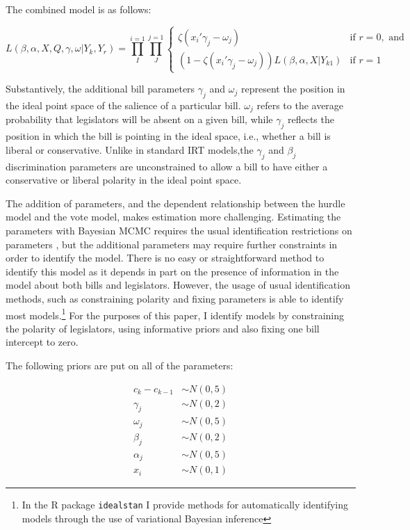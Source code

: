 	The combined model is as follows:
	
		 \[
	L(\beta,\alpha,X,Q,\gamma,\omega|Y_{k},Y_{r}) = 
	\prod_{I}^{i=1} \prod_{J}^{j=1}
	\begin{cases}
	\zeta(x_{i}'\gamma_j - \omega_j ) & \text{if } r=0, \text{ and} \\
	(1-\zeta({x_{i}'\gamma_j - \omega_j}))L(\beta,\alpha,X|Y_{k1}) & \text{if } r=1
	\end{cases}
	\]
	
	Substantively, the additional bill parameters $\gamma_j$ and $\omega_j$ represent the position in the ideal point space of the salience of a particular bill. $\omega_j$ refers to the average probability that legislators will be absent on a given bill, while $\gamma_j$ reflects the position in which the bill is pointing in the ideal space, i.e., whether a bill is liberal or conservative. Unlike in standard IRT models,the $\gamma_j$ and $\beta_j$ discrimination parameters are unconstrained to allow a bill to have either a conservative or liberal polarity in the ideal point space. 
	
	The addition of parameters, and the dependent relationship between the hurdle model and the vote model, makes estimation more challenging. Estimating the parameters with Bayesian MCMC requires the usual identification restrictions on parameters \parencite{jackman2004,gelman2005}, but the additional parameters may require further constraints in order to identify the model. There is no easy or straightforward method to identify this model as it depends in part on the presence of information in the model about both bills and legislators. However, the usage of usual identification methods, such as constraining polarity and fixing parameters is able to identify most models.\footnote{In the R package \texttt{idealstan} I provide methods for automatically identifying models through the use of variational Bayesian inference} For the purposes of this paper, I identify models by constraining the polarity of legislators, using informative priors and also fixing one bill intercept to zero.
	
	The following priors are put on all of the parameters:
	
	\begin{align*}
		c_k - c_{k-1} &\sim N(0,5)\\
		\gamma_j &\sim N(0,2)\\
		\omega_j &\sim N(0,5)\\
		\beta_j &\sim N(0,2)\\
		\alpha_j &\sim N(0,5)\\
		x_i &\sim N(0,1)
	\end{align*}

